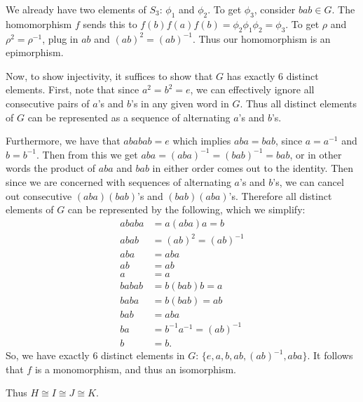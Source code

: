 We already have two elements of $S_3$: $\phi_1$ and $\phi_2$. To get $\phi_3$, consider $bab \in G$. The homomorphism $f$ sends this to $f(b)f(a)f(b) = \phi_2\phi_1\phi_2 = \phi_3$. To get $\rho$ and $\rho^2 = \rho^{-1}$, plug in $ab$ and $(ab)^2 = (ab)^{-1}$. Thus our homomorphism is an epimorphism.

Now, to show injectivity, it suffices to show that $G$ has exactly 6 distinct elements. First, note that since $a^2 = b^2 = e$, we can effectively ignore all consecutive pairs of $a$'s and $b$'s in any given word in $G$. Thus all distinct elements of $G$ can be represented as a sequence of alternating $a$'s and $b$'s.

Furthermore, we have that $ababab = e$ which implies $aba = bab$, since $a = a^{-1}$ and $b = b^{-1}$. Then from this we get $aba = (aba)^{-1} = (bab)^{-1} = bab$, or in other words the product of $aba$ and $bab$ in either order comes out to the identity. Then since we are concerned with sequences of alternating $a$'s and $b$'s, we can cancel out consecutive $(aba)(bab)$'s and $(bab)(aba)$'s. Therefore all distinct elements of $G$ can be represented by the following, which we simplify:
\begin{align*}
    ababa &= a(aba)a = b \\
    abab &= (ab)^2 = (ab)^{-1} \\
    aba &= aba \\
    ab &= ab \\
    a &= a \\
    babab &= b(bab)b = a \\
    baba &= b(bab) = ab \\
    bab &= aba \\
    ba &= b^{-1}a^{-1} = (ab)^{-1} \\
    b &= b.
\end{align*}
So, we have exactly 6 distinct elements in $G$: $\{e, a, b, ab, (ab)^{-1}, aba\}$. It follows that $f$ is a monomorphism, and thus an isomorphism.

Thus $H \cong I \cong J \cong K$.
